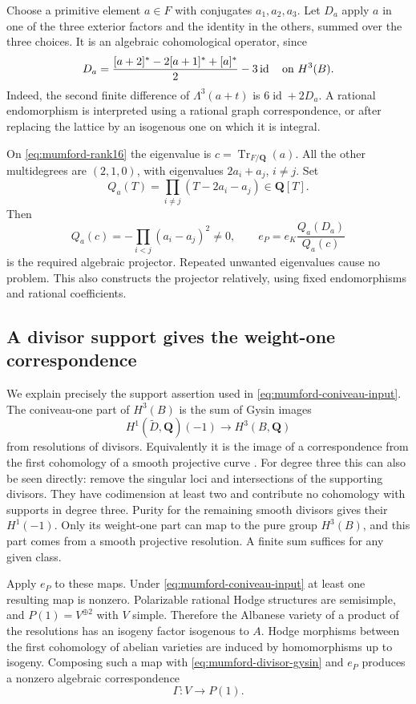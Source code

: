 Choose a primitive element $a\in F$ with conjugates $a_1,a_2,a_3$.
Let $D_a$ apply $a$ in one of the three exterior factors and the
identity in the others, summed over the three choices.  It is an
algebraic cohomological operator, since
\begin{equation}
 D_a=\frac{[a+2]^*-2[a+1]^*+[a]^*}{2}-3\operatorname{id}
       \quad\hbox{on }H^3(B).
 \label{eq:mumford-derivation}
\end{equation}
Indeed, the second finite difference of $\Lambda^3(a+t)$ is
$6\operatorname{id}+2D_a$.  A rational endomorphism is interpreted
using a rational graph correspondence, or after replacing the lattice
by an isogenous one on which it is integral.

On \eqref{eq:mumford-rank16} the eigenvalue is
$c=\operatorname{Tr}_{F/\mathbf Q}(a)$.
All the other multidegrees are $(2,1,0)$, with eigenvalues
$2a_i+a_j$, $i\ne j$.  Set
\[
 Q_a(T)=\prod_{i\ne j}(T-2a_i-a_j)\in\mathbf Q[T].
\]
Then
\[
 Q_a(c)=-\prod_{i<j}(a_i-a_j)^2\ne0,
 \qquad e_P=e_K\frac{Q_a(D_a)}{Q_a(c)}
\]
is the required algebraic projector.  Repeated unwanted eigenvalues
cause no problem.  This also constructs the projector relatively,
using fixed endomorphisms and rational coefficients.

\subsection{A divisor support gives the weight-one correspondence}

We explain precisely the support assertion used in
\eqref{eq:mumford-coniveau-input}.  The coniveau-one part of $H^3(B)$
is the sum of Gysin images
\begin{equation}
 H^1(\widetilde D,\mathbf Q)(-1)\longrightarrow H^3(B,\mathbf Q)
 \label{eq:mumford-divisor-gysin}
\end{equation}
from resolutions of divisors.  Equivalently it is the image of a
correspondence from the first cohomology of a smooth projective curve
\cite[Proposition~1.3, p.~8]{ACMV}.  For degree three this can also be seen
directly: remove the singular loci and intersections of the supporting
divisors.  They have codimension at least two and contribute no
cohomology with supports in degree three.  Purity for the remaining
smooth divisors gives their $H^1(-1)$.  Only its weight-one part can
map to the pure group $H^3(B)$, and this part comes from a smooth
projective resolution.  A finite sum suffices for any given class.

Apply $e_P$ to these maps.  Under
\eqref{eq:mumford-coniveau-input} at least one resulting map is
nonzero.  Polarizable rational Hodge structures are semisimple,
and $P(1)=V^{\oplus2}$ with $V$ simple.  Therefore the Albanese
variety of a product of the resolutions has an isogeny factor
isogenous to $A$.  Hodge morphisms between the first cohomology of
abelian varieties are induced by homomorphisms up to isogeny.
Composing such a map with \eqref{eq:mumford-divisor-gysin} and $e_P$
produces a nonzero algebraic correspondence
\begin{equation}
 \Gamma:V\longrightarrow P(1).
 \label{eq:mumford-coniveau-bridge}
\end{equation}

